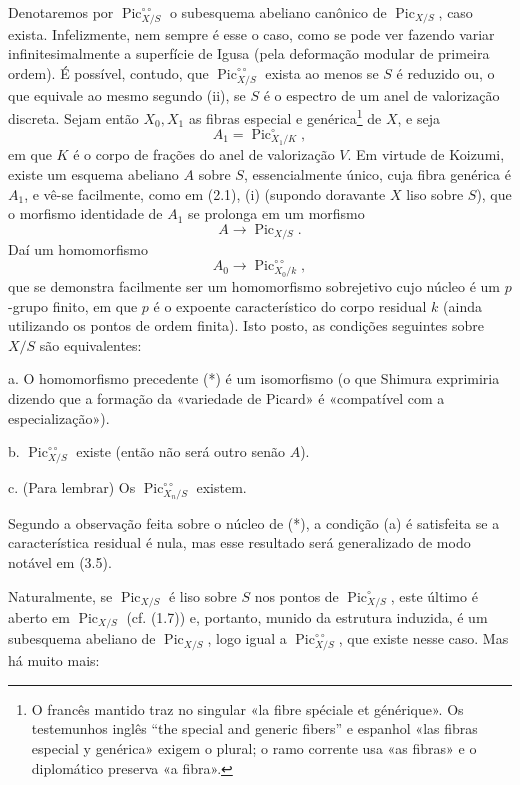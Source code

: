  Denotaremos por
$\operatorname{Pic}_{X/S}^{\circ\circ}$ o subesquema abeliano canônico de
$\operatorname{Pic}_{X/S}$, caso exista. Infelizmente, nem sempre é esse o
caso, como se pode ver fazendo variar infinitesimalmente a superfície de Igusa
(pela deformação modular de primeira ordem). É possível, contudo, que
$\operatorname{Pic}_{X/S}^{\circ\circ}$ exista ao menos se $S$ é reduzido ou,
o que equivale ao mesmo segundo (ii), se $S$ é o espectro de um anel de
valorização discreta. Sejam então $X_0,X_1$ as fibras especial e
genérica\footnote{O francês mantido traz no singular «la fibre spéciale et
générique». Os testemunhos inglês “the special and generic fibers” e espanhol
«las fibras especial y genérica» exigem o plural; o ramo corrente usa «as
fibras» e o diplomático preserva «a fibra».} de $X$, e seja
\[
A_1=\operatorname{Pic}_{X_1/K}^\circ,
\]
em que $K$ é o corpo de frações do anel de valorização $V$. Em virtude de
Koizumi, existe um esquema abeliano $A$ sobre $S$, essencialmente único, cuja
fibra genérica é $A_1$, e vê-se facilmente, como em (2.1), (i) (supondo
doravante $X$ liso sobre $S$), que o morfismo identidade de $A_1$ se prolonga em um
morfismo
\[
A\longrightarrow\operatorname{Pic}_{X/S}.
\]
Daí um homomorfismo
\[
\tag{*}A_0\longrightarrow\operatorname{Pic}_{X_0/k}^{\circ\circ},
\]
que se demonstra facilmente ser um homomorfismo sobrejetivo cujo núcleo é um
$p$-grupo finito, em que $p$ é o expoente característico do corpo residual $k$
(ainda utilizando os pontos de ordem finita). Isto posto, as condições
seguintes sobre $X/S$ são equivalentes:

\medskip
\noindent a. O homomorfismo precedente (*) é um isomorfismo (o que Shimura
exprimiria dizendo que a formação da «variedade de Picard» é «compatível com a
especialização»).

\noindent b. $\operatorname{Pic}_{X/S}^{\circ\circ}$ existe (então não será
outro senão $A$).

\noindent c. (Para lembrar) Os
$\operatorname{Pic}_{X_n/S}^{\circ\circ}$ existem.

Segundo a observação feita sobre o núcleo de (*), a condição (a) é satisfeita
se a característica residual é nula, mas esse resultado será generalizado de
modo notável em (3.5).

Naturalmente, se $\operatorname{Pic}_{X/S}$ é liso sobre $S$ nos pontos de
$\operatorname{Pic}_{X/S}^\circ$, este último é
aberto em $\operatorname{Pic}_{X/S}$ (cf. (1.7)) e, portanto, munido da
estrutura induzida, é um subesquema abeliano de
$\operatorname{Pic}_{X/S}$, logo igual a
$\operatorname{Pic}_{X/S}^{\circ\circ}$, que existe nesse caso. Mas há muito
mais:

